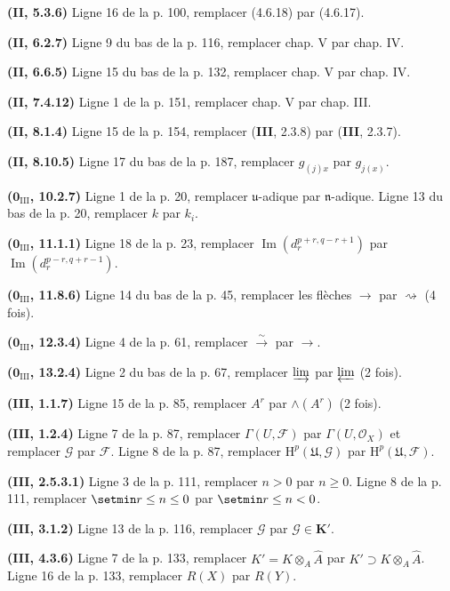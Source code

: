 \noindent\textbf{(II, 5.3.6)} Ligne 16 de la p. 100, remplacer (4.6.18) par
(4.6.17).

\noindent\textbf{(II, 6.2.7)} Ligne 9 du bas de la p. 116, remplacer chap. V
par chap. IV.

\noindent\textbf{(II, 6.6.5)} Ligne 15 du bas de la p. 132, remplacer chap. V
par chap. IV.

\noindent\textbf{(II, 7.4.12)} Ligne 1 de la p. 151, remplacer chap. V par
chap. III.

\noindent\textbf{(II, 8.1.4)} Ligne 15 de la p. 154, remplacer (\textbf{III}, 2.3.8)
par (\textbf{III}, 2.3.7).

\noindent\textbf{(II, 8.10.5)} Ligne 17 du bas de la p. 187, remplacer
$g_{(j)x}$ par $g_{j(x)}$.

\noindent\textbf{($\mathbf{0}_{\mathrm{III}}$, 10.2.7)} Ligne 1 de la p. 20,
remplacer $\mathfrak u$-adique par $\mathfrak n$-adique. Ligne 13 du bas de la p. 20,
remplacer $k$ par $k_i$.

\noindent\textbf{($\mathbf{0}_{\mathrm{III}}$, 11.1.1)} Ligne 18 de la p. 23,
remplacer $\operatorname{Im}(d_r^{p+r,q-r+1})$ par
$\operatorname{Im}(d_r^{p-r,q+r-1})$.

\noindent\textbf{($\mathbf{0}_{\mathrm{III}}$, 11.8.6)} Ligne 14 du bas de la p. 45,
remplacer les flèches $\to$ par $\rightsquigarrow$ (4 fois).

\noindent\textbf{($\mathbf{0}_{\mathrm{III}}$, 12.3.4)} Ligne 4 de la p. 61,
remplacer $\xrightarrow{\sim}$ par $\to$.

\noindent\textbf{($\mathbf{0}_{\mathrm{III}}$, 13.2.4)} Ligne 2 du bas de la p. 67,
remplacer $\varinjlim$ par $\varprojlim$ (2 fois).

\noindent\textbf{(III, 1.1.7)} Ligne 15 de la p. 85, remplacer $A^r$ par
$\wedge(A^r)$ (2 fois).

\noindent\textbf{(III, 1.2.4)} Ligne 7 de la p. 87, remplacer
$\Gamma(U,\mathscr F)$ par $\Gamma(U,\mathscr O_X)$ et remplacer $\mathscr G$
par $\mathscr F$. Ligne 8 de la p. 87, remplacer
$\mathrm H^p(\mathfrak U,\mathscr G)$ par $\mathrm H^p(\mathfrak U,\mathscr F)$.

\noindent\textbf{(III, 2.5.3.1)} Ligne 3 de la p. 111, remplacer $n>0$ par
$n\geq0$. Ligne 8 de la p. 111, remplacer $\setmin r\leq n\leq0$ par
$\setmin r\leq n<0$.

\noindent\textbf{(III, 3.1.2)} Ligne 13 de la p. 116, remplacer $\mathscr G$
par $\mathscr G\in\boldsymbol{K}'$.

\noindent\textbf{(III, 4.3.6)} Ligne 7 de la p. 133, remplacer
$K'=K\otimes_A\widehat A$ par $K'\supset K\otimes_A\widehat A$. Ligne 16 de
la p. 133, remplacer $R(X)$ par $R(Y)$.

